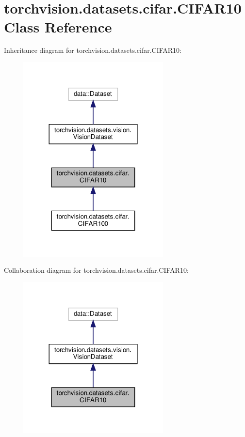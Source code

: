 \hypertarget{classtorchvision_1_1datasets_1_1cifar_1_1CIFAR10}{}\section{torchvision.\+datasets.\+cifar.\+C\+I\+F\+A\+R10 Class Reference}
\label{classtorchvision_1_1datasets_1_1cifar_1_1CIFAR10}


Inheritance diagram for torchvision.\+datasets.\+cifar.\+C\+I\+F\+A\+R10\+:
\nopagebreak
\begin{figure}[H]
\begin{center}
\leavevmode
\includegraphics[width=216pt]{classtorchvision_1_1datasets_1_1cifar_1_1CIFAR10__inherit__graph}
\end{center}
\end{figure}


Collaboration diagram for torchvision.\+datasets.\+cifar.\+C\+I\+F\+A\+R10\+:
\nopagebreak
\begin{figure}[H]
\begin{center}
\leavevmode
\includegraphics[width=216pt]{classtorchvision_1_1datasets_1_1cifar_1_1CIFAR10__coll__graph}
\end{center}
\end{figure}
